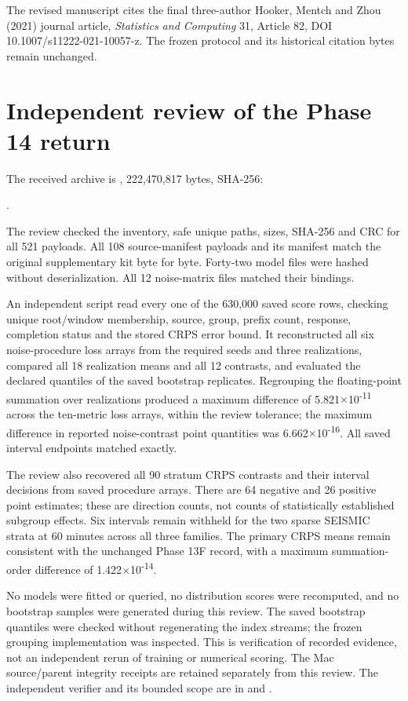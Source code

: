 The revised manuscript cites the final three-author Hooker, Mentch and Zhou (2021) journal article, \emph{Statistics and Computing} 31, Article 82, DOI 10.1007/s11222-021-10057-z. The frozen protocol and its historical citation bytes remain unchanged.

\hypertarget{independent-review-of-the-phase-14-return}{%
\section{Independent review of the Phase 14 return}\label{independent-review-of-the-phase-14-return}}

The received archive is , 222,470,817 bytes, SHA-256:

.

The review checked the inventory, safe unique paths, sizes, SHA-256 and CRC for all 521 payloads. All 108 source-manifest payloads and its manifest match the original supplementary kit byte for byte. Forty-two model files were hashed without deserialization. All 12 noise-matrix files matched their bindings.

An independent script read every one of the 630,000 saved score rows, checking unique root/window membership, source, group, prefix count, response, completion status and the stored CRPS error bound. It reconstructed all six noise-procedure loss arrays from the required seeds and three realizations, compared all 18 realization means and all 12 contrasts, and evaluated the declared quantiles of the saved bootstrap replicates. Regrouping the floating-point summation over realizations produced a maximum difference of 5.821\ensuremath{\times}10\textsuperscript{-11} across the ten-metric loss arrays, within the review tolerance; the maximum difference in reported noise-contrast point quantities was 6.662\ensuremath{\times}10\textsuperscript{-16}. All saved interval endpoints matched exactly.

The review also recovered all 90 stratum CRPS contrasts and their interval decisions from saved procedure arrays. There are 64 negative and 26 positive point estimates; these are direction counts, not counts of statistically established subgroup effects. Six intervals remain withheld for the two sparse SEISMIC strata at 60 minutes across all three families. The primary CRPS means remain consistent with the unchanged Phase 13F record, with a maximum summation-order difference of 1.422\ensuremath{\times}10\textsuperscript{-14}.

No models were fitted or queried, no distribution scores were recomputed, and no bootstrap samples were generated during this review. The saved bootstrap quantiles were checked without regenerating the index streams; the frozen grouping implementation was inspected. This is verification of recorded evidence, not an independent rerun of training or numerical scoring. The Mac source/parent integrity receipts are retained separately from this review. The independent verifier and its bounded scope are in  and .
